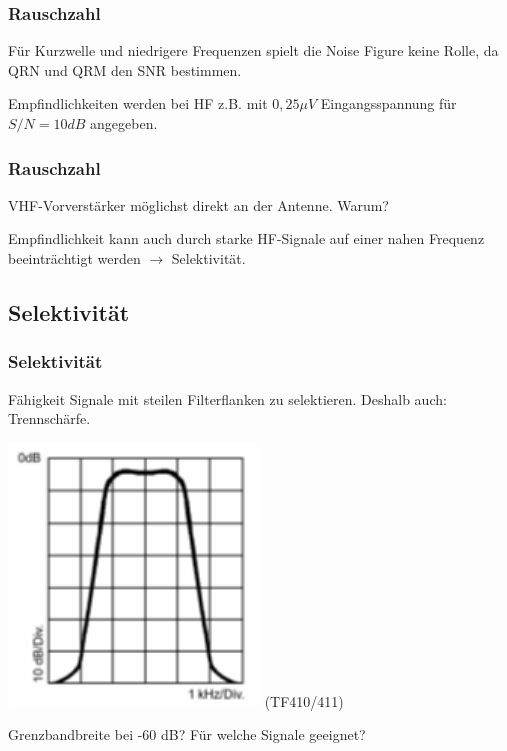 \begin{frame}
    \frametitle{Rauschzahl}

    Für Kurzwelle und niedrigere Frequenzen spielt die Noise Figure keine Rolle,
    da QRN und QRM den SNR bestimmen.

    \bigskip

    Empfindlichkeiten werden bei HF z.B. mit $0,25 \mu V$ Eingangsspannung für
    $S/N=10 dB$ angegeben.

\end{frame}

\begin{frame}
    \frametitle{Rauschzahl}

    VHF-Vorverstärker möglichst direkt an der Antenne. Warum?

    \bigskip

    Empfindlichkeit kann auch durch starke HF-Signale auf einer nahen Frequenz
    beeinträchtigt werden $\rightarrow$ Selektivität.

\end{frame}

\subsection{Selektivität}

\begin{frame}
    \frametitle{Selektivität}

    Fähigkeit Signale mit steilen Filterflanken zu selektieren. Deshalb auch:
    Trennschärfe.

    \begin{center}
    \includegraphics[width=0.5\textwidth]{a18/TF410.png}
        \tiny (TF410/411)
    \end{center}

    Grenzbandbreite bei -60 dB? Für welche Signale geeignet?

\end{frame}

